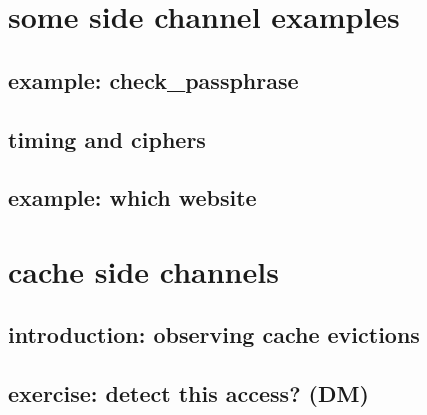 
\section{some side channel examples}

\subsection{example: check\_passphrase}



\subsection{timing and ciphers}



\subsection{example: which website}






\section{cache side channels}

\subsection{introduction: observing cache evictions}



\subsection{exercise: detect this access? (DM)}

